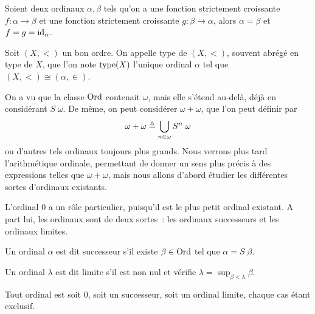 \begin{corollary}
  Soient deux ordinaux $\alpha,\beta$ tels qu'on a une fonction strictement
  croissante $f : \alpha \to \beta$ et une fonction strictement croissante
  $g : \beta \to \alpha$, alors $\alpha = \beta$ et $f = g = \operatorname{id}_\alpha$.
\end{corollary}

\begin{definition}
  Soit $(X,<)$ un bon ordre. On appelle type de $(X,<)$, souvent abrégé en
  type de $X$, que l'on note $\operatorname{type}(X)$ l'unique ordinal $\alpha$ tel que
  $(X,<)\cong (\alpha,\in)$.
\end{definition}

On a vu que la classe $\operatorname{Ord}$ contenait $\omega$, mais elle s'étend au-delà, déjà
en considérant $S\;\omega$. De même, on peut considérer $\omega + \omega$, que
l'on peut définir par
\[\omega + \omega \triangleq \bigcup_{n \in \omega} S^n\;\omega\]
ou d'autres tels ordinaux toujours plus grands. Nous verrons plus tard
l'arithmétique ordinale, permettant de donner un sens plus précis à des
expressions telles que $\omega + \omega$, mais nous allons d'abord étudier les
différentes sortes d'ordinaux existants.

L'ordinal $0$ a un rôle particulier, puisqu'il est le plus petit ordinal
existant. A part lui, les ordinaux sont de deux sortes~: les ordinaux
successeurs et les ordinaux limites.

\begin{definition}
  Un ordinal $\alpha$ est dit successeur s'il existe $\beta \in \operatorname{Ord}$ tel que
  $\alpha = S\;\beta$.
\end{definition}

\begin{definition}
  Un ordinal $\lambda$ est dit limite s'il est non nul et vérifie
  $\lambda = \sup_{\beta < \lambda} \beta$.
\end{definition}

\begin{property}
  Tout ordinal est soit $0$, soit un successeur, soit un ordinal limite, chaque
  cas étant exclusif.
\end{property}

